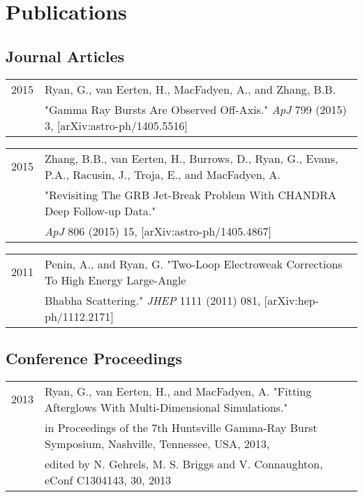 \documentclass[letterpaper]{article}
\renewenvironment{itemize}{
  \begin{list}{}{
    \setlength{\leftmargin}{1.5em}
  }
}{
  \end{list}
}
\begin{document}
\section*{Publications}
\subsection*{Journal Articles}
\begin{itemize}
\item \begin{tabular}{ll}
2015 & Ryan, G., van Eerten, H., MacFadyen, A., and Zhang, B.B. \\ 
	& "Gamma Ray Bursts Are Observed Off-Axis."  \emph{ApJ} 799 (2015) 3, [arXiv:astro-ph/1405.5516] \\
\end{tabular}

\item \begin{tabular}{ll}
2015 & Zhang, B.B., van Eerten, H., Burrows, D., Ryan, G., {Evans}, P.A., Racusin, J., Troja, E., and MacFadyen, A. \\
 & "Revisiting The GRB Jet-Break Problem With CHANDRA Deep Follow-up Data."  \\
&  \emph{ApJ} 806 (2015) 15, [arXiv:astro-ph/1405.4867] \\
\end{tabular}

\item \begin{tabular}{ll}
2011 & Penin, A., and Ryan, G.  "Two-Loop Electroweak Corrections To High Energy Large-Angle \\& Bhabha Scattering." \emph{JHEP} 1111 (2011) 081, [arXiv:hep-ph/1112.2171] \\
\end{tabular}
\end{itemize}

\subsection*{Conference Proceedings}
\begin{itemize}
\item \begin{tabular}{ll}
2013 & Ryan, G., van Eerten, H., and MacFadyen, A. "Fitting Afterglows With Multi-Dimensional Simulations." \\& in Proceedings of the 7th Huntsville Gamma-Ray Burst Symposium, Nashville, Tennessee, USA, 2013, \\& edited by N. Gehrels, M. S. Briggs and V. Connaughton, eConf C1304143, 30, 2013 \\
\end{tabular}
\end{itemize}
\end{document}
